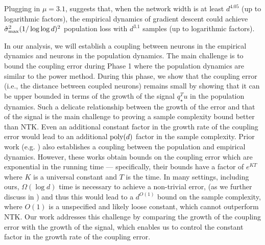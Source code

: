 Plugging in $\mu=3.1$,  suggests that, when the network width is at least $d^{4.05}$ (up to logarithmic factors), the empirical dynamics of gradient descent could achieve $\hat{\sigma}_{\textup{max}}^2 (1/\log\log d)^2$ population loss with $d^{3.1}$ samples (up to logarithmic factors).

In our analysis, we will establish a coupling between neurons in the empirical dynamics and neurons in the population dynamics. The main challenge is to bound the coupling error during Phase 1 where the population dynamics are similar to the power method.
During this phase, we show that the coupling error (i.e., the distance between coupled neurons) remains small by showing that it can be upper bounded in terms of the growth of the signal $q_{\star}^Tu$ in the population dynamics. Such a delicate relationship between the growth of the error and that of the signal is the main challenge to proving a sample complexity bound better than NTK. Even an additional constant factor in the growth rate of the coupling error would lead to an additional $\textup{poly}(d)$ factor in the sample complexity. Prior work (e.g. \citet{mei2019mean, abbe2022merged}) also establishes a coupling between the population and empirical dynamics. However, these works obtain bounds on the coupling error which are exponential in the running time --- specifically, their bounds have a factor of $e^{KT}$ where $K$ is a universal constant and $T$ is the time. In many settings, including ours, $\Omega(\log d)$ time is necessary to achieve a non-trivial error, (as we further discuss in ) and thus %
this would lead to a $d^{O(1)}$ bound on the sample complexity, where $O(1)$ is a unspecified and likely loose constant, which cannot outperform NTK. 
Our work addresses this challenge by comparing the growth of the coupling error with the growth of the signal, which enables us to control the constant factor in the growth rate of the coupling error.


